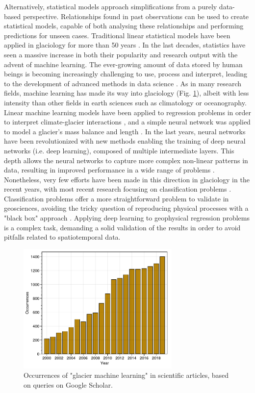 Alternatively, statistical models approach simplifications from a purely data-based perspective. Relationships found in past observations can be used to create statistical models, capable of both analysing these relationships and performing predictions for unseen cases. Traditional linear statistical models have been applied in glaciology for more than 50 years \citep{hoinkes_glacier_1968, martin_correlation_1974}. In the last decades, statistics have seen a massive increase in both their popularity and research output with the advent of machine learning. The ever-growing amount of data stored by human beings is becoming increasingly challenging to use, process and interpret, leading to the development of advanced methods in data science \citep{mjolsness_machine_2001}. As in many research fields, machine learning has made its way into glaciology (Fig.  \ref{intro:fig3}), albeit with less intensity than other fields in earth sciences such as climatology or oceanography. Linear machine learning models have been applied to regression problems in order to interpret climate-glacier interactions \citep{maussion_enso_2015}, and a simple neural network was applied to model a glacier's mass balance and length \citep{steiner_application_2005,steiner_sensitivity_2008}.  In the last years, neural networks have been revolutionized with new methods enabling the training of deep neural networks (i.e. deep learning), composed of multiple intermediate layers. This depth allows the neural networks to capture more complex non-linear patterns in data, resulting in improved performance in a wide range of problems \citep{wang_origin_2017}. Nonetheless, very few efforts have been made in this direction in glaciology in the recent years, with most recent research focusing on classification problems \citep{mohajerani_detection_2019, baumhoer_automated_2019, zhang_automatically_2019}. Classification problems offer a more straightforward problem to validate in geosciences, avoiding the tricky question of reproducing physical processes with a "black box" approach \citep{karpatne_theory-guided_2017}. Applying deep learning to geophysical regression problems is a complex task, demanding a solid validation of the results in order to avoid pitfalls related to spatiotemporal data. 

\begin{figure}[h]
\centering
\includegraphics[width=8cm]{Figures/intro/Figure_3.pdf}
\caption{Occurrences of "glacier machine learning" in scientific articles, based on queries on Google Scholar.} 
\label{intro:fig3}
\end{figure} 

